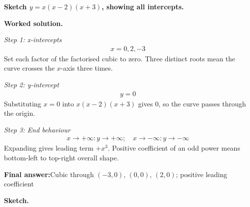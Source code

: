 \documentclass[11pt]{article}
\newcommand{\question}[1]{\par\medskip\noindent\textbf{#1}\par}
\begin{document}
\question{Sketch \( y = x(x-2)(x+3) \), showing all intercepts.}

\textbf{Worked solution.}

\textit{Step 1: x-intercepts}
\[\begin{gathered}
x = 0, 2, -3
\end{gathered}\]
Set each factor of the factorised cubic to zero. Three distinct roots mean the curve crosses the \( x \)-axis three times.

\textit{Step 2: y-intercept}
\[\begin{gathered}
y = 0
\end{gathered}\]
Substituting \( x = 0 \) into \( x(x-2)(x+3) \) gives \( 0 \), so the curve passes through the origin.

\textit{Step 3: End behaviour}
\[\begin{gathered}
x \to +\infty: y \to +\infty; \quad x \to -\infty: y \to -\infty
\end{gathered}\]
Expanding gives leading term \( +x^3 \). Positive coefficient of an odd power means bottom-left to top-right overall shape.

\begin{answerbox}
\textbf{Final answer:}\quad Cubic through \(\displaystyle (-3,0)\), \(\displaystyle (0,0)\), \(\displaystyle (2,0)\); positive leading coefficient
\end{answerbox}
\textbf{Sketch.}
\end{document}
